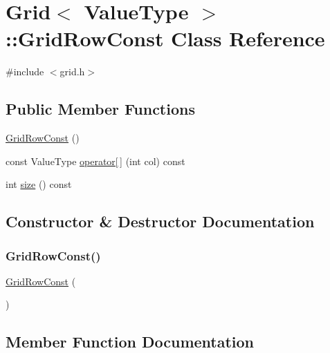 \hypertarget{classGrid_1_1GridRowConst}{}\section{Grid$<$ Value\+Type $>$\+:\+:Grid\+Row\+Const Class Reference}
\label{classGrid_1_1GridRowConst}


{\ttfamily \#include $<$grid.\+h$>$}

\subsection*{Public Member Functions}
\begin{DoxyCompactItemize}
\item 
\mbox{\hyperlink{classGrid_1_1GridRowConst_a17bd70462bbfff3b2282b607f8060c9a}{Grid\+Row\+Const}} ()
\item 
const Value\+Type \mbox{\hyperlink{classGrid_1_1GridRowConst_a3dc8d98145632fca91f860f4f720e219}{operator\mbox{[}$\,$\mbox{]}}} (int col) const
\item 
int \mbox{\hyperlink{classGrid_1_1GridRowConst_af9593d4a5ff4274efaf429cb4f9e57cc}{size}} () const
\end{DoxyCompactItemize}


\subsection{Constructor \& Destructor Documentation}
\mbox{\label{classGrid_1_1GridRowConst_a17bd70462bbfff3b2282b607f8060c9a}} 
\subsubsection{\texorpdfstring{Grid\+Row\+Const()}{GridRowConst()}}
{\footnotesize\ttfamily \mbox{\hyperlink{classGrid_1_1GridRowConst}{Grid\+Row\+Const}} (\begin{DoxyParamCaption}{ }\end{DoxyParamCaption})\hspace{0.3cm}{\ttfamily [inline]}}



\subsection{Member Function Documentation}
\mbox{\label{classGrid_1_1GridRowConst_a3dc8d98145632fca91f860f4f720e219}} 
